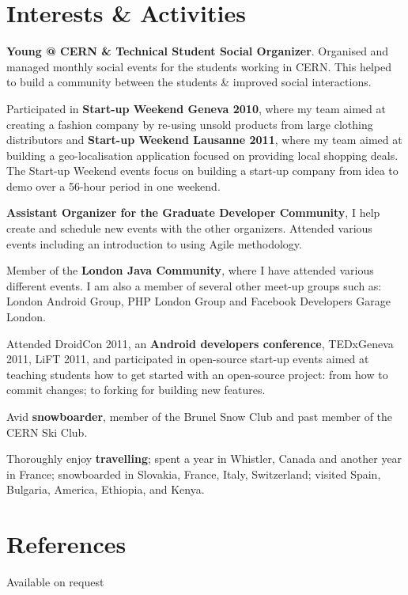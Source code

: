 \documentclass[final,a4paper,notitlepage,10pt]{report}
\begin{document}
\section*{Interests \& Activities {\hfill\raisebox{.5ex}{\makebox[.65\textwidth]{\hrulefill}}}}
\begin{compactitemize}
\item \textbf{Young @ CERN \& Technical Student Social Organizer}. Organised and managed monthly social events for the students working in CERN. This helped to build a community between the students \& improved social interactions.
\item Participated in \textbf{Start-up Weekend Geneva 2010}, where my team aimed at creating a fashion company by re-using unsold products from large clothing distributors and \textbf{Start-up Weekend Lausanne 2011}, where my team aimed at building a geo-localisation application focused on providing local shopping deals. The Start-up Weekend events focus on building a start-up company from idea to demo over a 56-hour period in one weekend.
\item \textbf{Assistant Organizer for the Graduate Developer Community}, I help create and schedule new events with the other organizers. Attended various events including an introduction to using Agile methodology.
\item Member of the \textbf{London Java Community}, where I have attended various different events. I am also a member of several other meet-up groups such as: London Android Group, PHP London Group and Facebook Developers Garage London.
\item Attended DroidCon 2011, an \textbf{Android developers conference}, TEDxGeneva 2011, LiFT 2011, and participated in open-source start-up events aimed at teaching students how to get started with an open-source project: from how to commit changes; to forking for building new features.
\item Avid \textbf{snowboarder}, member of the Brunel Snow Club and past member of the CERN Ski Club.
\item Thoroughly enjoy \textbf{travelling}; spent a year in Whistler, Canada and another year in France; snowboarded in Slovakia, France, Italy, Switzerland; visited Spain, Bulgaria, America, Ethiopia, and Kenya.
\end{compactitemize}

\section*{References {\hfill\raisebox{.5ex}{\makebox[.65\textwidth]{\hrulefill}}}}
Available on request
\end{document}
